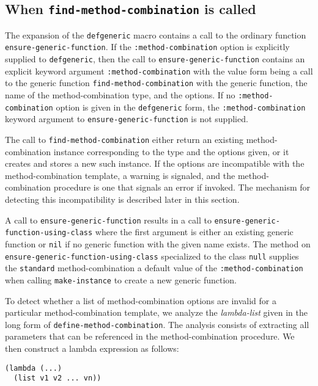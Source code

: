 \subsection{When \texttt{find-method-combination} is called}

The expansion of the \texttt{defgeneric} macro contains a call to the
ordinary function \texttt{ensure-generic-function}.  If the
\texttt{:method-combination} option is explicitly supplied to
\texttt{defgeneric}, then the call to \texttt{ensure-generic-function}
contains an explicit keyword argument \texttt{:method-combination}
with the value form being a call to the generic function
\texttt{find-method-combination} with the generic function, the name
of the method-combination type, and the options.  If no
\texttt{:method-combination} option is given in the
\texttt{defgeneric} form, the \texttt{:method-combination} keyword
argument to \texttt{ensure-generic-function} is not supplied.

The call to \texttt{find-method-combination} either return an existing
method-combination instance corresponding to the type and the options
given, or it creates and stores a new such instance.  If the options
are incompatible with the method-combination template, a warning is
signaled, and the method-combination procedure is one that signals an
error if invoked.  The mechanism for detecting this incompatibility is
described later in this section.

A call to \texttt{ensure-generic-function} results in a call to
\texttt{ensure-generic-function-using-class} where the first argument
is either an existing generic function or \texttt{nil} if no generic
function with the given name exists.  The method on
\texttt{ensure-generic-function-using-class} specialized to the class
\texttt{null} supplies the \texttt{standard} method-combination a
default value of the \texttt{:method-combination} when calling
\texttt{make-instance} to create a new generic function.

To detect whether a list of method-combination options are invalid for
a particular method-combination template, we analyze the
\emph{lambda-list} given in the long form of
\texttt{define-method-combination}.  The analysis consists of
extracting all parameters that can be referenced in the
method-combination procedure.  We then construct a lambda expression
as follows:

\begin{verbatim}
(lambda (...)
  (list v1 v2 ... vn))
\end{verbatim}

